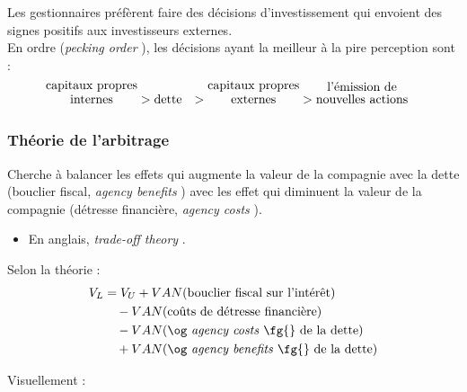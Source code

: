 \documentclass[10pt, french]{article}
\begin{document}
\begin{multicols*}{2}
\begin{definitionNOHFILL}
Les gestionnaires préfèrent faire des décisions d'investissement qui envoient des signes positifs aux investisseurs externes.\\

En ordre (\og \textit{pecking order} \fg{}), les décisions ayant la meilleur à la pire perception sont :
\begin{align*}
	\shortstack{capitaux propres\\ internes}	
	&>	
	\shortstack{dette}	
	&>	
	\shortstack{capitaux propres\\ externes}	
	&>	
	\shortstack{l'émission de\\ nouvelles actions}
\end{align*}
\end{definitionNOHFILL}


\columnbreak
\subsubsection{Théorie de l'arbitrage}
Cherche à balancer les effets qui augmente la valeur de la compagnie avec la dette (bouclier fiscal, \og \textit{agency benefits} \fg{}) avec les effet qui diminuent la valeur de la compagnie (détresse financière, \og \textit{agency costs} \fg{}).

\begin{itemize}
	\item	En anglais, \og \textit{trade-off theory} \fg{}.
\end{itemize}

Selon la théorie : 
\begin{align*}
	V_{L}
	&=	V_{U} 
		+ VAN(\text{bouclier fiscal sur l'intérêt})	\\
&\quad 	- VAN(\text{coûts de détresse financière})\\
&\quad 	- VAN(\text{\og \textit{agency costs} \fg{} de la dette})\\
&\quad 	+ VAN(\text{\og \textit{agency benefits} \fg{} de la dette})
\end{align*}

Visuellement : 
\begin{center}

\begin{tikzpicture}[x=0.75pt,y=0.75pt,yscale=-1,xscale=1]


\end{tikzpicture}
\end{center}
\end{multicols*}
\end{document}
